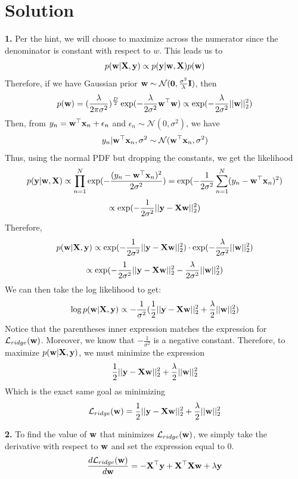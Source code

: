\documentclass[submit]{../harvardml}
\newenvironment{solution}
  {\color{black}\section*{Solution}}
{}
\begin{document}
\newpage
\begin{solution}
    \begin{tcolorbox}
        \textbf{1.} Per the hint, we will choose to maximize across the numerator since the denominator is constant with respect to $w$. This leads us to
        $$p(\mathbf{w} | \mathbf{X}, \mathbf{y}) \propto p(\bold y | \mathbf{w}, \mathbf{X})p(\mathbf{w})$$
        Therefore, if we have Gaussian prior $\mathbf{w} \sim \mathcal{N}(\mathbf{0},\frac{\sigma^2}{\lambda}\mathbf{I})$, then
        $$p(\mathbf{w}) = (\frac{\lambda}{2\pi\sigma^2})^{\frac{D}{2}} \exp(- \frac{\lambda}{2\sigma^2} \mathbf{w}^\top\mathbf{w}) \propto \exp(-\frac{\lambda}{2\sigma^2} ||\mathbf{w}||^2_2)$$
        Then, from $y_n = \mathbf{w}^\top\mathbf{x}_n + \epsilon_n$ and  $\epsilon_n \sim \mathcal{N}(0, \sigma^2)$, we have 
        $$y_n | \mathbf{w}^\top\mathbf{x}_n, \sigma^2  \sim \mathcal{N}(\mathbf{w}^\top\mathbf{x}_n, \sigma^2)$$
        Thus, using the normal PDF but dropping the constants, we get the likelihood
        $$p(\bold y | \mathbf{w}, \mathbf{X}) \propto \prod_{n=1}^N \exp(- \frac{(y_n - \mathbf{w}^\top\mathbf{x}_n)^2}{2\sigma^2}) = \exp(- \frac{1}{2\sigma^2}\sum_{n=1}^N (y_n - \mathbf{w}^\top\mathbf{x}_n)^2)$$
        $$\propto  \exp(- \frac{1}{2\sigma^2} ||\mathbf{y} - \mathbf{X}\mathbf{w}||^2_2)$$
        Therefore,
        $$p(\mathbf{w} | \mathbf{X}, \mathbf{y}) \propto \exp(- \frac{1}{2\sigma^2} ||\mathbf{y} - \mathbf{X}\mathbf{w}||^2_2) \cdot \exp(-\frac{\lambda}{2\sigma^2} ||\mathbf{w}||^2_2)$$ 
        $$\propto \exp(-\frac{1}{2\sigma^2} ||\mathbf{y} - \mathbf{X}\mathbf{w}||^2_2 -\frac{\lambda}{2\sigma^2} ||\mathbf{w}||^2_2)$$
        We can then take the log likelihood to get:
        $$\log p(\mathbf{w} | \mathbf{X}, \mathbf{y}) \propto -\frac{1}{\sigma^2} (\frac{1}{2}||\mathbf{y} - \mathbf{X}\mathbf{w}||^2_2 +\frac{\lambda}{2} ||\mathbf{w}||^2_2)$$
        Notice that the parentheses inner expression matches the expression for $\mathcal{L}_{ridge}(\mathbf{w})$. Moreover, we know that $-\frac{1}{\sigma^2}$ is a negative constant. Therefore, to maximize $p(\mathbf{w} | \mathbf{X}, \mathbf{y})$, we must minimize the expression
        $$\frac{1}{2}||\mathbf{y} - \mathbf{X}\mathbf{w}||^2_2 +\frac{\lambda}{2} ||\mathbf{w}||^2_2$$
        Which is the exact same goal as minimizing
        $$\mathcal{L}_{ridge}(\mathbf{w}) = \frac{1}{2}||\mathbf{y} -\bold X\mathbf{w}||_2^2 + \frac{\lambda}{2}||\mathbf{w}||_2^2$$
    \end{tcolorbox}
    \begin{tcolorbox}
        \textbf{2.} To find the value of $\mathbf{w}$ that minimizes $\mathcal{L}_{ridge}(\mathbf{w})$, we simply take the derivative with respect to $\mathbf{w}$ and set the expression equal to 0.
        $$\frac{d\mathcal{L}_{ridge}(\mathbf{w})}{d\mathbf{w}} = -\mathbf{X}^\top\mathbf{y} + \mathbf{X}^\top\mathbf{X}\mathbf{w} + \lambda\mathbf{y}$$

\end{tcolorbox}
\end{solution}
\end{document}
